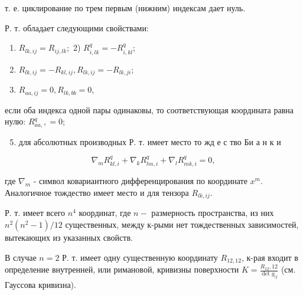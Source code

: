 \documentclass[10pt]{article}
\begin{document}
т. е. циклирование по трем первым (нижним) индексам дает нуль.



Р. т. обладает следующими свойствами:



\begin{enumerate}

  \item $R_{l k, i j}=R_{i j, l k} ;$ 2) $R_{i, l k}^{q}=-R_{i, k l}^{q}$;



  \item $R_{l k, i j}=-R_{k l, i j}, R_{l k, i j}=-R_{l k, j i}$;



  \item $R_{a a, i j}=0, R_{l k, b b}=0$,



\end{enumerate}



если оба индекса одной пары одинаковы, то соответствующая координата равна нулю: $R_{a a,}^{q},=0$;



\begin{enumerate}

  \setcounter{enumi}{4}

  \item для абсолютных производных Р. т. имеет место то жд е с тво Би а н к и

\end{enumerate}



\[

\nabla_{m} R_{k l, i}^{q}+\nabla_{k} R_{l m, i}^{q}+\nabla_{l} R_{m k, i}^{q}=0,

\]



где $\nabla_{m}$ - символ ковариантного дифференцирования по координате $x^{m}$. Аналогичное тождество имеет место и для тензора $R_{l k, i j}$.



Р. т. имеет всего $n^{4}$ координат, где $n-$ размерность пространства, из них $n^{2}\left(n^{2}-1\right) / 12$ существенных, между к-рыми нет тождественных зависимостей, вытекающих из указанных свойств.



В случае $n=2$ Р. т. имеет одну существенную координату $R_{12,12}$, к-рая входит в определение внутренней, или римановой, кривизны поверхности $K=\frac{R_{12}, 12}{\operatorname{det} g_{i j}}$ (см. Гауссова кривизна).
\end{document}
